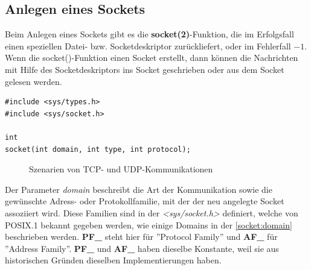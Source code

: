 \subsection{Anlegen eines Sockets}

Beim Anlegen eines Sockets gibt es die \textbf{socket(2)}-Funktion, die im Erfolgsfall einen speziellen Datei- bzw. Socketdeskriptor zurückliefert, oder im Fehlerfall $-1$. Wenn die socket()-Funktion einen Socket erstellt, dann können die Nachrichten mit Hilfe des Socketdeskriptors ins Socket geschrieben oder aus dem Socket gelesen werden. 

\begin{verbatim}
#include <sys/types.h>
#include <sys/socket.h>

int 
socket(int domain, int type, int protocol);
\end{verbatim} 
\smallskip \smallskip

\begin{figure}[htbp]
	\centering
	\caption[Szenarien von TCP- und UDP-Kommunikationen]{Szenarien von TCP- und UDP-Kommunikationen \cite{Stevens:2004:UNP1}}\label{fig:tcp_udp} 
\end{figure}

Der Parameter \textit{domain} beschreibt die Art der Kommunikation sowie die gewünschte Adress- oder Protokollfamilie, mit der der neu angelegte Socket assoziiert wird. Diese Familien sind in der \textit{<sys/socket.h>} definiert, welche von POSIX.1 bekannt gegeben werden, wie einige Domains in der \autoref{socket:domain} beschrieben werden. \textbf{PF\_} steht hier für ''Protocol Family'' und \textbf{AF\_} für ''Address Family''. \textbf{PF\_} und \textbf{AF\_} haben dieselbe Konstante, weil sie aus historischen Gründen dieselben Implementierungen haben. \smallskip \smallskip

